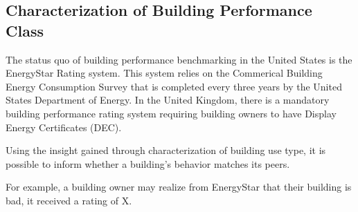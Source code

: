 \subsection{Characterization of Building Performance Class}
\label{sec:results_benchmarking}

The status quo of building performance benchmarking in the United States is the EnergyStar Rating system. This system relies on the Commerical Building Energy Consumption Survey that is completed every three years by the United States Department of Energy. In the United Kingdom, there is a mandatory building performance rating system requiring building owners to have Display Energy Certificates (DEC).

Using the insight gained through characterization of building use type, it is possible to inform whether a building's behavior matches its peers.

For example, a building owner may realize from EnergyStar that their building is bad, it received a rating of X.

